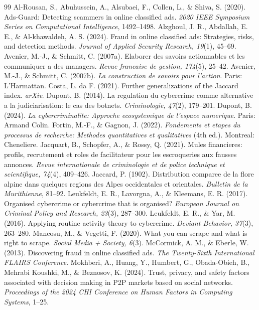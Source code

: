 \documentclass[11pt,a4paper]{article}
\begin{document}
\begin{thebibliography}{99}
 Al-Rousan, S., Abuhussein, A., Alsubaei, F., Collen, L., \& Shiva, S. (2020). Ads-Guard: Detecting scammers in online classified ads. \emph{2020 IEEE Symposium Series on Computational Intelligence}, 1492--1498.
 Alzghoul, J. R., Abdallah, E. E., \& Al-khawaldeh, A. S. (2024). Fraud in online classified ads: Strategies, risks, and detection methods. \emph{Journal of Applied Security Research, 19}(1), 45--69.
 Avenier, M.-J., \& Schmitt, C. (2007a). Elaborer des savoirs actionnables et les communiquer a des managers. \emph{Revue francaise de gestion, 174}(5), 25--42.
 Avenier, M.-J., \& Schmitt, C. (2007b). \emph{La construction de savoirs pour l'action}. Paris: L'Harmattan.
 Costa, L. da F. (2021). Further generalizations of the Jaccard index. \emph{arXiv}.
 Dupont, B. (2014). La regulation du cybercrime comme alternative a la judiciarisation: le cas des botnets. \emph{Criminologie, 47}(2), 179--201.
 Dupont, B. (2024). \emph{La cybercriminalite: Approche ecosystemique de l'espace numerique}. Paris: Armand Colin.
 Fortin, M.-F., \& Gagnon, J. (2022). \emph{Fondements et etapes du processus de recherche: Methodes quantitatives et qualitatives} (4th ed.). Montreal: Cheneliere.
 Jacquart, B., Schopfer, A., \& Rossy, Q. (2021). Mules financieres: profils, recrutement et roles de facilitateur pour les escroqueries aux fausses annonces. \emph{Revue internationale de criminologie et de police technique et scientifique, 74}(4), 409--426.
 Jaccard, P. (1902). Distribution comparee de la flore alpine dans quelques regions des Alpes occidentales et orientales. \emph{Bulletin de la Murithienne}, 81--92.
 Leukfeldt, E. R., Lavorgna, A., \& Kleemans, E. R. (2017). Organised cybercrime or cybercrime that is organised? \emph{European Journal on Criminal Policy and Research, 23}(3), 287--300.
 Leukfeldt, E. R., \& Yar, M. (2016). Applying routine activity theory to cybercrime. \emph{Deviant Behavior, 37}(3), 263--280.
 Mancosu, M., \& Vegetti, F. (2020). What you can scrape and what is right to scrape. \emph{Social Media + Society, 6}(3).
 McCormick, A. M., \& Eberle, W. (2013). Discovering fraud in online classified ads. \emph{The Twenty-Sixth International FLAIRS Conference}.
 Mokhberi, A., Huang, Y., Humbert, G., Obada-Obieh, B., Mehrabi Koushki, M., \& Beznosov, K. (2024). Trust, privacy, and safety factors associated with decision making in P2P markets based on social networks. \emph{Proceedings of the 2024 CHI Conference on Human Factors in Computing Systems}, 1--25.

\end{thebibliography}
\end{document}
